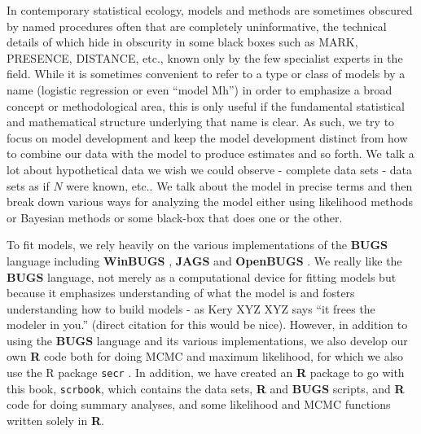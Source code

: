 In contemporary statistical ecology, models and methods are sometimes
obscured by named procedures often that are completely uninformative,
the technical details of which hide in obscurity in some black boxes
such as MARK, PRESENCE, DISTANCE, etc., known only by the few
specialist experts in the field. While it is sometimes convenient to
refer to a type or class of models by a name (logistic regression or
even ``model Mh'') in order to emphasize a broad concept or
methodological area, this is only useful if the fundamental
statistical and mathematical structure underlying that name is
clear. As such, we try to focus on model development and keep the
model development distinct from how to combine our data with the model
to produce estimates and so forth. We talk a lot about hypothetical
data we wish we could observe - complete data sets - data sets as if
$N$ were known, etc.. We talk about the model in precise terms and
then break down various ways for analyzing the model either using
likelihood methods or Bayesian methods or some black-box that does one
or the other.

To fit models, we rely heavily on the various implementations of the
{\bf BUGS} language including {\bf WinBUGS} \citep{lunn_etal:2000},
{\bf JAGS} \citep{plummer:2003}
 and {\bf OpenBUGS} \citep{thomas_etal:2006}. We really like
the {\bf BUGS} language, not merely  as a computational device for
fitting models but because it emphasizes
understanding of what the model is and fosters understanding how to
build models - as Kery XYZ XYZ says ``it frees the modeler in you.''  (direct
citation for this would be nice).  However, in addition to using the
{\bf BUGS} language and its various implementations, we also develop our own
{\bf R} code both for doing MCMC
and maximum likelihood, for which we also use the R
package \mbox{\tt secr} \citep{efford:2011}. In addition, we have
created an {\bf R} package to go with this book, \mbox{\tt scrbook},
which contains the data sets, {\bf R} and {\bf BUGS} scripts, and {\bf
  R} code for doing summary analyses, and some likelihood and MCMC
functions written solely in {\bf R}.
